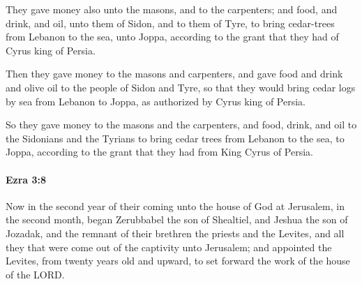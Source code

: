 			\begin{versebox}
					\item[BHS] 
					\item[LXX] 
					\item[ASV] They gave money also unto the masons, and to the carpenters; and food, and drink, and oil, unto them of Sidon, and to them of Tyre, to bring cedar-trees from Lebanon to the sea, unto Joppa, according to the grant that they had of Cyrus king of Persia.
					\item[NIV] Then they gave money to the masons and carpenters, and gave food and drink and olive oil to the people of Sidon and Tyre, so that they would bring cedar logs by sea from Lebanon to Joppa, as authorized by Cyrus king of Persia.
					\item[NRSV] So they gave money to the masons and the carpenters, and food, drink, and oil to the Sidonians and the Tyrians to bring cedar trees from Lebanon to the sea, to Joppa, according to the grant that they had from King Cyrus of Persia.
			\end{versebox}

		\paragraph{Ezra 3:8} %
			\label{EZRA-3-8}

			Now in the second year of their coming unto the house of God at Jerusalem, in the second month, began Zerubbabel the son of Shealtiel, and Jeshua the son of Jozadak, and the remnant of their brethren the priests and the Levites, and all they that were come out of the captivity unto Jerusalem; and appointed the Levites, from twenty years old and upward, to set forward the work of the house of the LORD.

